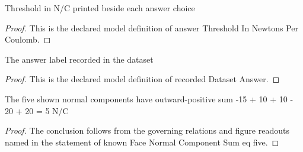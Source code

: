 \begin{definition}
  \label{def:physics:phyx-mini-0840:phyxminiproblems-problemphyxmini0840-answerthresholdinnewtonspercoulomb}
  Threshold in N/C printed beside each answer choice
\end{definition}
\begin{proof}
  This is the declared model definition of answer Threshold In Newtons Per Coulomb.
\end{proof}
\begin{definition}
  \label{def:physics:phyx-mini-0840:phyxminiproblems-problemphyxmini0840-recordeddatasetanswer}
  The answer label recorded in the dataset
\end{definition}
\begin{proof}
  This is the declared model definition of recorded Dataset Answer.
\end{proof}
\begin{lemma}
  \label{lem:physics:phyx-mini-0840:phyxminiproblems-problemphyxmini0840-knownfacenormalcomponentsum-eq-five}
  The five shown normal components have outward-positive sum -15 + 10 + 10 - 20 + 20 = 5 N/C
\end{lemma}
\begin{proof}
  The conclusion follows from the governing relations and figure readouts named in the statement of known Face Normal Component Sum eq five.
\end{proof}
